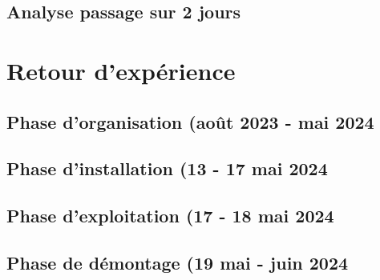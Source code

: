 \documentclass[12pt,a4paper]{report}
\begin{document}
\section{Analyse passage sur 2 jours}

\chapter{Retour d'expérience}

\section{Phase d'organisation (août 2023 - mai 2024}

\section{Phase d'installation (13 - 17 mai 2024}

\section{Phase d'exploitation (17 - 18 mai 2024}

\section{Phase de démontage (19 mai - juin 2024}
\end{document}

